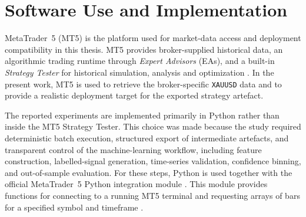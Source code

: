 











\section{Software Use and Implementation}


MetaTrader~5 (MT5) is the platform used for market-data access and deployment
compatibility in this thesis. MT5 provides broker-supplied historical data, an
algorithmic trading runtime through \emph{Expert Advisors} (EAs), and a built-in
\emph{Strategy Tester} for historical simulation, analysis and optimization
\citep{mt5_testing_help, mql5_runtime_testing}. In the present work, MT5 is used
to retrieve the broker-specific \texttt{XAUUSD} data and to provide a realistic
deployment target for the exported strategy artefact.

The reported experiments are implemented primarily in Python rather than inside
the MT5 Strategy Tester. This choice was made because the study required
deterministic batch execution, structured export of intermediate artefacts, and
transparent control of the machine-learning workflow, including feature
construction, labelled-signal generation, time-series validation, confidence
binning, and out-of-sample evaluation. For these steps, Python is used together
with the official MetaTrader~5 Python integration module
\citep{mt5_python_integration}. This module provides functions for connecting to
a running MT5 terminal and requesting arrays of bars for a specified symbol and
timeframe \citep{mt5_python_integration, mt5_copy_rates_range}.

